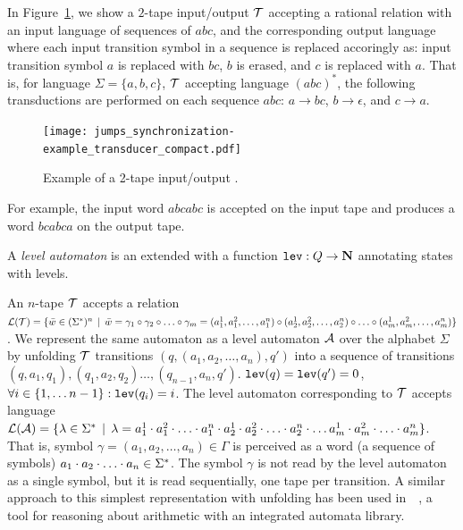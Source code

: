 \begin{example}\label{example:2_tape_nft}
In Figure~\ref{fig:2_tape_nft}, we show a $2$-tape input/output \nft $\mathcal{T}$ accepting a rational relation with an input language of sequences of $abc$, and the corresponding output language where each input transition symbol in a sequence is replaced accoringly as: input transition symbol $a$ is replaced with $bc$, $b$ is erased, and $c$ is replaced with $a$.
That is, for language $\Sigma = \{ a, b, c \}$, $\mathcal{T}$ accepting language $(abc)^*$, the following transductions are performed on each sequence $abc$:
$a \rightarrow bc$,
$b \rightarrow \epsilon$, and
$c \rightarrow a$.

\begin{figure}[!ht]
  \centering
    \texttt{[image: jumps\_synchronization-example\_transducer\_compact.pdf]}
  \caption{
    Example of a 2-tape input/output \nft.
  }\label{fig:2_tape_nft}
\end{figure}

For example, the input word $abcabc$ is accepted on the input tape and produces a word $bcabca$ on the output tape.

\end{example}

A \emph{level automaton} is an \nfa extended with a function $\texttt{lev}: Q \rightarrow \mathbf{N}$ annotating states with levels.

An $n$-tape \nft $\mathcal{T}$ accepts a relation $\mathcal{L}(\mathcal{T}) = \{ \bar{{w}} \in (\Sigma^*)^n \,\mid\, \bar{{w}} = \gamma_1 \circ \gamma_2 \circ \ldots \circ \gamma_m = (a^1_1, a^2_1, \ldots, a^n_1) \circ (a^1_2, a^2_2, \ldots, a^n_2) \circ \ldots \circ (a^1_m, a^2_m, \ldots, a^n_m) \}$.
We represent the same automaton as a level automaton $\mathcal{A}$ over the alphabet $\Sigma$ by unfolding $\mathcal{T}$ transitions $(q, (a_1, a_2, \ldots, a_n), q')$ into a sequence of \nfa transitions $(q, a_1, q_1), (q_1, a_2, q_2) \ldots, (q_{n - 1}, a_n, q')$.
$\texttt{lev}(q) = \texttt{lev}(q') = 0$, $\forall i \in \{ 1, \ldots n - 1  \}: \texttt{lev}(q_i) = i$.
The level automaton corresponding to $\mathcal{T}$ accepts language $\mathcal{L}(\mathcal{A}) = \{ \lambda \in \Sigma^* \,\mid\, \lambda = a^1_1 \cdot a^2_1 \cdot \ldots \cdot a^n_1 \cdot a^1_2 \cdot a^2_2 \cdot \ldots \cdot a^n_2 \cdot \ldots a^1_m \cdot a^2_m \cdot \ldots \cdot a^n_m \}$.
That is, \nft symbol $\gamma = (a_1, a_2, \ldots, a_n) \in \Gamma$ is perceived as a word (a sequence of symbols) $a_1 \cdot a_2\cdot \ldots \cdot a_n \in \Sigma^*$.
The symbol $\gamma$ is not read by the level automaton as a single symbol, but it is read sequentially, one tape per transition.
A similar approach to this simplest representation with unfolding has been used in~\lash~\cite{10.1007/3-540-46419-0_1}, a tool for reasoning about arithmetic with an integrated automata library.

